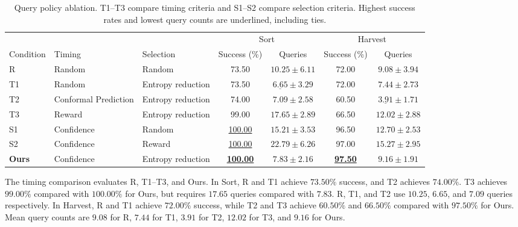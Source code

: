 \begin{table}[t]
\centering
\caption{Query policy ablation. T1--T3 compare timing criteria and S1--S2 compare selection criteria. Highest success rates and lowest query counts are underlined, including ties.}
\label{tab:policy_ablation}
\label{tab:when_what_random}
\small
\setlength{\tabcolsep}{4pt}
\begin{tabular}{lllcccc}
\toprule
 & & & \multicolumn{2}{c}{Sort} & \multicolumn{2}{c}{Harvest} \\
\cmidrule(lr){4-5}\cmidrule(lr){6-7}
Condition & Timing & Selection & Success (\%) & Queries & Success (\%) & Queries \\
\midrule
R & Random & Random & 73.50 & $10.25 \pm 6.11$ & 72.00 & $9.08 \pm 3.94$ \\
T1 & Random & Entropy reduction & 73.50 & $\underline{6.65} \pm 3.29$ & 72.00 & $7.44 \pm 2.73$ \\
T2 & Conformal Prediction & Entropy reduction & 74.00 & $7.09 \pm 2.58$ & 60.50 & $\underline{3.91} \pm 1.71$ \\
T3 & Reward & Entropy reduction & 99.00 & $17.65 \pm 2.89$ & 66.50 & $12.02 \pm 2.88$ \\
S1 & Confidence & Random & \underline{100.00} & $15.21 \pm 3.53$ & 96.50 & $12.70 \pm 2.53$ \\
S2 & Confidence & Reward & \underline{100.00} & $22.79 \pm 6.26$ & 97.00 & $15.27 \pm 2.95$ \\
\textbf{Ours} & Confidence & Entropy reduction & \textbf{\underline{100.00}} & $\boldsymbol{7.83 \pm 2.16}$ & \textbf{\underline{97.50}} & $\boldsymbol{9.16 \pm 1.91}$ \\
\bottomrule
\end{tabular}
\end{table}

The timing comparison evaluates R, T1--T3, and Ours. In Sort, R and T1 achieve $73.50\%$ success, and T2 achieves $74.00\%$. T3 achieves $99.00\%$ compared with $100.00\%$ for Ours, but requires $17.65$ queries compared with $7.83$. R, T1, and T2 use $10.25$, $6.65$, and $7.09$ queries respectively. In Harvest, R and T1 achieve $72.00\%$ success, while T2 and T3 achieve $60.50\%$ and $66.50\%$ compared with $97.50\%$ for Ours. Mean query counts are $9.08$ for R, $7.44$ for T1, $3.91$ for T2, $12.02$ for T3, and $9.16$ for Ours.

